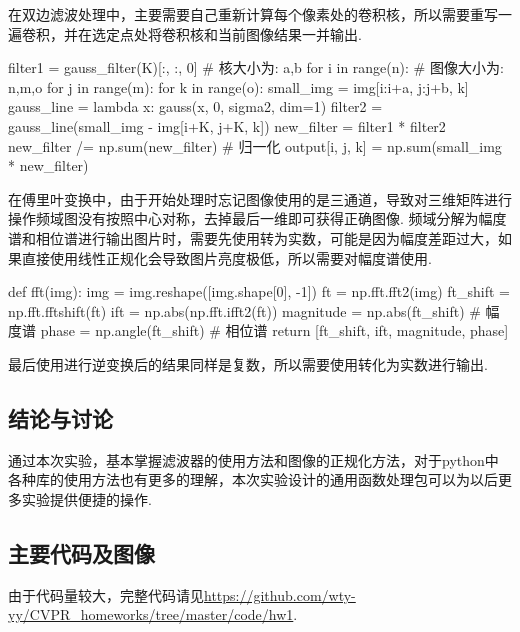 \documentclass[12pt, a4paper, oneside]{ctexart}
\begin{document}
在双边滤波处理中，主要需要自己重新计算每个像素处的卷积核，所以需要重写一遍卷积，并在选定点处将卷积核和当前图像结果一并输出.
\begin{pythoncode}
filter1 = gauss_filter(K)[:, :, 0]  # 核大小为: a,b
for i in range(n):  # 图像大小为: n,m,o
    for j in range(m):
        for k in range(o):
            small_img = img[i:i+a, j:j+b, k]
            gauss_line = lambda x: gauss(x, 0, sigma2, dim=1)
            filter2 = gauss_line(small_img - img[i+K, j+K, k])
            new_filter = filter1 * filter2
            new_filter /= np.sum(new_filter)  # 归一化
            output[i, j, k] = np.sum(small_img * new_filter)
\end{pythoncode}

在傅里叶变换中，由于开始处理时忘记图像使用的是三通道，导致对三维矩阵进行操作频域图没有按照中心对称，去掉最后一维即可获得正确图像. 频域分解为幅度谱和相位谱进行输出图片时，需要先使用转为实数，可能是因为幅度差距过大，如果直接使用线性正规化会导致图片亮度极低，所以需要对幅度谱使用.
\begin{pythoncode}
def fft(img):
    img = img.reshape([img.shape[0], -1])
    ft = np.fft.fft2(img)
    ft_shift = np.fft.fftshift(ft)
    ift = np.abs(np.fft.ifft2(ft))
    magnitude = np.abs(ft_shift)  # 幅度谱
    phase = np.angle(ft_shift)  # 相位谱
    return [ft_shift, ift, magnitude, phase]
\end{pythoncode}

最后使用进行逆变换后的结果同样是复数，所以需要使用转化为实数进行输出.

\subsection{结论与讨论}
通过本次实验，基本掌握滤波器的使用方法和图像的正规化方法，对于python中各种库的使用方法也有更多的理解，本次实验设计的通用函数处理包可以为以后更多实验提供便捷的操作. 

\subsection{主要代码及图像}
由于代码量较大，完整代码请见\url{https://github.com/wty-yy/CVPR_homeworks/tree/master/code/hw1}.
\end{document}
